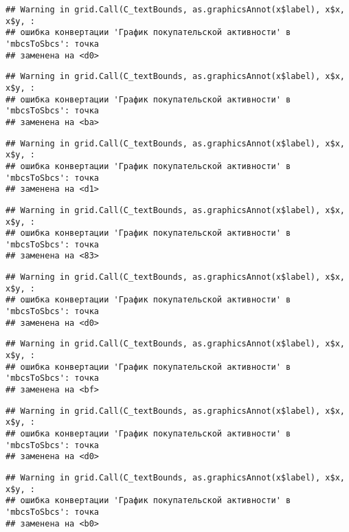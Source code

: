 \documentclass[
]{article}
\begin{document}
\begin{verbatim}
## Warning in grid.Call(C_textBounds, as.graphicsAnnot(x$label), x$x, x$y, :
## ошибка конвертации 'График покупательской активности' в 'mbcsToSbcs': точка
## заменена на <d0>
\end{verbatim}

\begin{verbatim}
## Warning in grid.Call(C_textBounds, as.graphicsAnnot(x$label), x$x, x$y, :
## ошибка конвертации 'График покупательской активности' в 'mbcsToSbcs': точка
## заменена на <ba>
\end{verbatim}

\begin{verbatim}
## Warning in grid.Call(C_textBounds, as.graphicsAnnot(x$label), x$x, x$y, :
## ошибка конвертации 'График покупательской активности' в 'mbcsToSbcs': точка
## заменена на <d1>
\end{verbatim}

\begin{verbatim}
## Warning in grid.Call(C_textBounds, as.graphicsAnnot(x$label), x$x, x$y, :
## ошибка конвертации 'График покупательской активности' в 'mbcsToSbcs': точка
## заменена на <83>
\end{verbatim}

\begin{verbatim}
## Warning in grid.Call(C_textBounds, as.graphicsAnnot(x$label), x$x, x$y, :
## ошибка конвертации 'График покупательской активности' в 'mbcsToSbcs': точка
## заменена на <d0>
\end{verbatim}

\begin{verbatim}
## Warning in grid.Call(C_textBounds, as.graphicsAnnot(x$label), x$x, x$y, :
## ошибка конвертации 'График покупательской активности' в 'mbcsToSbcs': точка
## заменена на <bf>
\end{verbatim}

\begin{verbatim}
## Warning in grid.Call(C_textBounds, as.graphicsAnnot(x$label), x$x, x$y, :
## ошибка конвертации 'График покупательской активности' в 'mbcsToSbcs': точка
## заменена на <d0>
\end{verbatim}

\begin{verbatim}
## Warning in grid.Call(C_textBounds, as.graphicsAnnot(x$label), x$x, x$y, :
## ошибка конвертации 'График покупательской активности' в 'mbcsToSbcs': точка
## заменена на <b0>
\end{verbatim}
\end{document}
